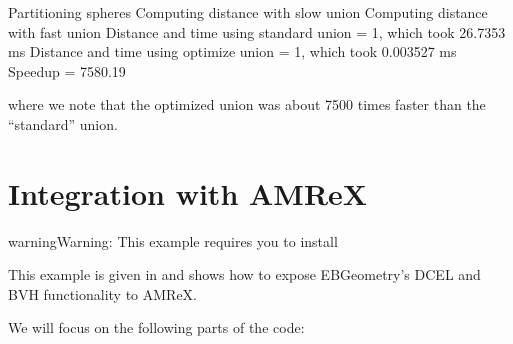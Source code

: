\documentclass[letterpaper,10pt,english]{sphinxmanual}
\begin{document}
\begin{sphinxVerbatim}[commandchars=\\\{\}]
Partitioning spheres
Computing distance with slow union
Computing distance with fast union
Distance and time using standard union = \PYGZhy{}1, which took 26.7353 ms
Distance and time using optimize union = \PYGZhy{}1, which took 0.003527 ms
Speedup = 7580.19
\end{sphinxVerbatim}

\sphinxAtStartPar
where we note that the optimized union was about 7500 times faster than the “standard” union.

\sphinxstepscope


\section{Integration with AMReX}
\label{\detokenize{Example_AMReX:integration-with-amrex}}\label{\detokenize{Example_AMReX::doc}}
\begin{sphinxadmonition}{warning}{Warning:}
\sphinxAtStartPar
This example requires you to install 
\end{sphinxadmonition}

\sphinxAtStartPar
This example is given in  and shows how to expose EBGeometry’s DCEL and BVH functionality to AMReX.

\sphinxAtStartPar
We will focus on the following parts of the code:
\end{document}
